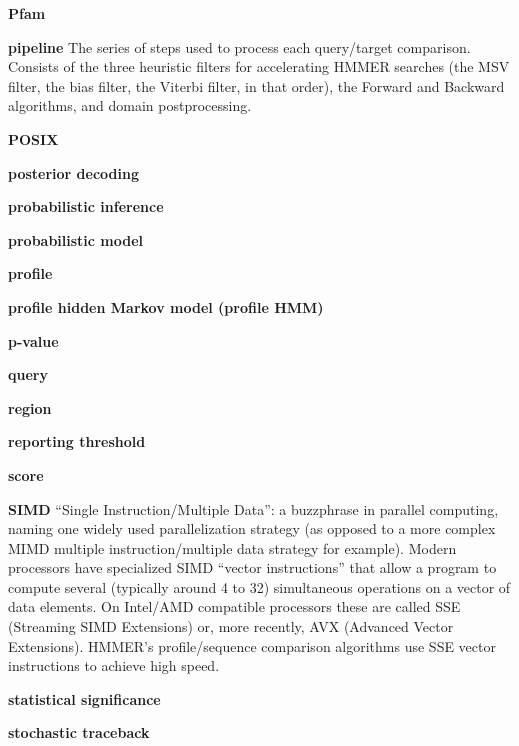\begin{wideitem}
\item[\textbf{Pfam}]

\item[\textbf{pipeline}] The series of steps used to process each
query/target comparison. Consists of the three heuristic filters for
accelerating HMMER searches (the MSV filter, the bias filter, the
Viterbi filter, in that order), the Forward and Backward algorithms,
and domain postprocessing.

\item[\textbf{POSIX}]

\item[\textbf{posterior decoding}]

\item[\textbf{probabilistic inference}]

\item[\textbf{probabilistic model}]

\item[\textbf{profile}]

\item[\textbf{profile hidden Markov model (profile HMM)}]

\item[\textbf{p-value}]

\item[\textbf{query}] 

\item[\textbf{region}]

\item[\textbf{reporting threshold}]

\item[\textbf{score}] 

\item[\textbf{SIMD}] ``Single Instruction/Multiple Data'': a
  buzzphrase in parallel computing, naming one widely used
  parallelization strategy (as opposed to a more complex MIMD multiple
  instruction/multiple data strategy for example). Modern processors
  have specialized SIMD ``vector instructions'' that allow a program
  to compute several (typically around 4 to 32) simultaneous
  operations on a vector of data elements.  On Intel/AMD compatible
  processors these are called SSE (Streaming SIMD Extensions) or, more
  recently, AVX (Advanced Vector Extensions).  HMMER's
  profile/sequence comparison algorithms use SSE vector instructions
  to achieve high speed.

\item[\textbf{statistical significance}] 

\item[\textbf{stochastic traceback}]


\end{wideitem}
